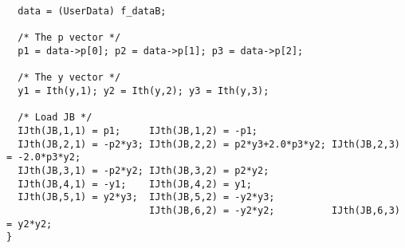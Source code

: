 \begin{verbatim}
  data = (UserData) f_dataB;

  /* The p vector */
  p1 = data->p[0]; p2 = data->p[1]; p3 = data->p[2];

  /* The y vector */
  y1 = Ith(y,1); y2 = Ith(y,2); y3 = Ith(y,3);

  /* Load JB */
  IJth(JB,1,1) = p1;     IJth(JB,1,2) = -p1; 
  IJth(JB,2,1) = -p2*y3; IJth(JB,2,2) = p2*y3+2.0*p3*y2; IJth(JB,2,3) = -2.0*p3*y2;
  IJth(JB,3,1) = -p2*y2; IJth(JB,3,2) = p2*y2;
  IJth(JB,4,1) = -y1;    IJth(JB,4,2) = y1; 
  IJth(JB,5,1) = y2*y3;  IJth(JB,5,2) = -y2*y3; 
                         IJth(JB,6,2) = -y2*y2;          IJth(JB,6,3) = y2*y2; 
}
\end{verbatim}